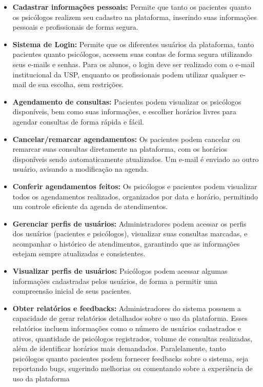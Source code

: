\documentclass[a4paper,12pt]{report}
\begin{document}
\begin{itemize}
    \item \textbf{Cadastrar informações pessoais:} Permite que tanto os pacientes quanto os psicólogos realizem seu cadastro na plataforma, inserindo suas informações pessoais e profissionais de forma segura.

    \item \textbf{Sistema de Login:} Permite que os diferentes usuários da plataforma, tanto pacientes quanto psicólogos, acessem suas contas de forma segura utilizando seus e-mails e senhas. Para os alunos, o login deve ser realizado com o e-mail institucional da USP, enquanto os profissionais podem utilizar qualquer e-mail de sua escolha, sem restrições.
    
    \item \textbf{Agendamento de consultas:} Pacientes podem visualizar os psicólogos disponíveis, bem como suas informações, e escolher horários livres para agendar consultas de forma rápida e fácil.

    \item \textbf{Cancelar/remarcar agendamentos:} Os pacientes podem cancelar ou remarcar suas consultas diretamente na plataforma, com os horários disponíveis sendo automaticamente atualizados. Um e-mail é enviado ao outro usuário, avisando a modificação na agenda.
    
    \item \textbf{Conferir agendamentos feitos:} Os psicólogos e pacientes podem visualizar todos os agendamentos realizados, organizados por data e horário, permitindo um controle eficiente da agenda de atendimentos. 
    
    \item \textbf{Gerenciar perfis de usuários:} Administradores podem acessar os perfis dos usuários (pacientes e psicólogos), visualizar suas consultas marcadas, e acompanhar o histórico de atendimentos, garantindo que as informações estejam sempre atualizadas e consistentes.

    \item \textbf{Visualizar perfis de usuários:} Psicólogos podem acessar algumas informações cadastradas pelos usuários, de forma a permitir uma compreensão inicial de seus pacientes.
    
    \item \textbf{Obter relatórios e feedbacks:} Administradores do sistema possuem a capacidade de gerar relatórios detalhados sobre o uso da plataforma. Esses relatórios incluem informações como o número de usuários cadastrados e ativos, quantidade de psicólogos registrados, volume de consultas realizadas, além de identificar horários mais demandados. Paralelamente, tanto psicólogos quanto pacientes podem fornecer feedbacks
    sobre o sistema, seja reportando bugs, sugerindo melhorias ou comentando sobre a
    experiência de uso da plataforma


\end{itemize}
\end{document}
